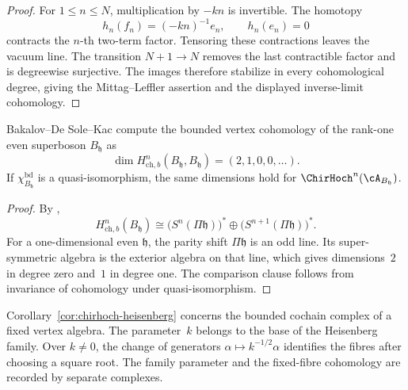 \begin{proof}
For \(1\leq n\leq N\), multiplication by \(-kn\) is invertible.  The
homotopy
\[
 h_n(f_n)=(-kn)^{-1}e_n,\qquad h_n(e_n)=0
\]
contracts the \(n\)-th two-term factor.  Tensoring these contractions
leaves the vacuum line.  The transition \(N+1\to N\) removes the last
contractible factor and is degreewise surjective.  The images
therefore stabilize in every cohomological degree, giving the
Mittag--Leffler assertion and the displayed inverse-limit cohomology.
\end{proof}

\begin{corollary}
\label{cor:chirhoch-heisenberg}
Bakalov--De Sole--Kac compute the bounded vertex cohomology of the
rank-one even superboson \(B_{\mathfrak h}\) as
\[
 \dim H^n_{\mathrm{ch},b}(B_{\mathfrak h},B_{\mathfrak h})
 =(2,1,0,0,\ldots).
\]
If \(\chi_{B_{\mathfrak h}}^{\mathrm{bd}}\) is a quasi-isomorphism,
the same dimensions hold for
\(\ChirHoch^n(\cA_{B_{\mathfrak h}})\).
\end{corollary}

\begin{proof}
By \cite[Theorem~7.4]{BDSK21},
\[
 H^n_{\mathrm{ch},b}(B_{\mathfrak h})
 \cong
 \bigl(S^n(\Pi\mathfrak h)\bigr)^*
 \oplus
 \bigl(S^{n+1}(\Pi\mathfrak h)\bigr)^*.
\]
For a one-dimensional even \(\mathfrak h\), the parity shift
\(\Pi\mathfrak h\) is an odd line.  Its super-symmetric algebra is
the exterior algebra on that line, which gives dimensions~\(2\) in
degree zero and~\(1\) in degree one.  The comparison clause follows
from invariance of cohomology under quasi-isomorphism.
\end{proof}

\begin{remark}
\label{rem:heisenberg-family-vs-fixed-fiber}
Corollary~\ref{cor:chirhoch-heisenberg} concerns the bounded cochain
complex of a fixed vertex algebra.  The parameter~\(k\) belongs to the
base of the Heisenberg family.  Over \(k\neq0\), the change of
generators \(\alpha\mapsto k^{-1/2}\alpha\) identifies the fibres
after choosing a square root.  The family parameter and the fixed-fibre
cohomology are recorded by separate complexes.
\end{remark}

